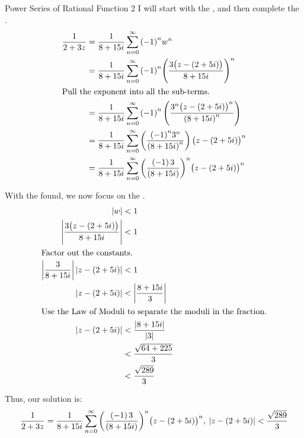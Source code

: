 \begin{example}{Power Series of Rational Function 2}
  I will start with the , and then complete the .
  \begin{align*}
    \frac{1}{2 + 3z} &= \frac{1}{8+15i} \sum_{n=0}^{\infty} {(-1)}^{n} w^{n} \\
                     &= \frac{1}{8+15i} \sum_{n=0}^{\infty} {(-1)}^{n} {\left( \frac{3 \bigl( z - (2+5i) \bigr)}{8+15i} \right)}^{n} \\
    \shortintertext{Pull the exponent into all the sub-terms.}
                     &= \frac{1}{8+15i} \sum_{n=0}^{\infty} {(-1)}^{n} \left( \frac{3^{n} {\bigl( z - (2+5i) \bigr)}^{n}}{{(8+15i)}^{n}} \right) \\
                     &= \frac{1}{8+15i} \sum_{n=0}^{\infty} \left( \frac{{(-1)}^{n} 3^{n} }{{(8+15i)}^{n}} \right) {\bigl( z - (2+5i) \bigr)}^{n} \\
                     &= \frac{1}{8+15i} \sum_{n=0}^{\infty} {\left( \frac{(-1)\, 3}{(8+15i)} \right)}^{n} {\bigl( z - (2+5i) \bigr)}^{n} \\
  \end{align*}

  With the  found, we now focus on the .
  \begin{align*}
    \left\lvert w \right\rvert &< 1 \\
    \left\lvert \frac{3 \bigl( z - (2+5i) \bigr)}{8+15i} \right\rvert &< 1 \\
    \shortintertext{Factor out the constants.}
    \left\lvert \frac{3}{8+15i} \right\rvert \left\lvert z - (2+5i) \right\rvert &< 1 \\
    \left\lvert z - (2+5i) \right\rvert &< \left\lvert \frac{8+15i}{3} \right\rvert \\
    \shortintertext{Use the Law of Moduli to separate the moduli in the fraction.}
    \left\lvert z - (2+5i) \right\rvert &< \frac{\left\lvert 8+15i \right\rvert}{\left\lvert 3 \right\rvert} \\
                &< \frac{\sqrt{64 + 225}}{3} \\
    &< \frac{\sqrt{289}}{3}
  \end{align*}

  Thus, our solution is:
  \begin{equation*}
    \frac{1}{2 + 3z} = \frac{1}{8+15i} \sum_{n=0}^{\infty} {\left( \frac{(-1)\, 3}{(8+15i)} \right)}^{n} {\bigl( z - (2+5i) \bigr)}^{n} , \: \left\lvert z - (2+5i) \right\rvert < \frac{\sqrt{289}}{3}
  \end{equation*}
\end{example}

